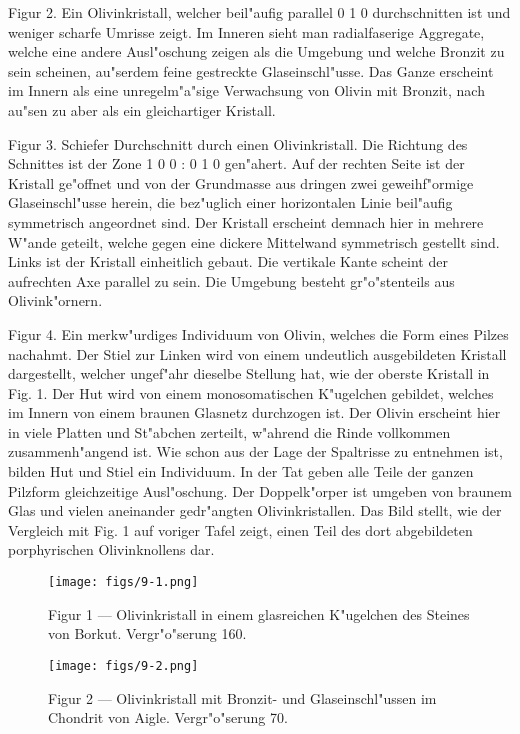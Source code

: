 \documentclass[a4paper, 11pt, oneside, polutonikogreek, german]{article}
\begin{document}
Figur 2. Ein Olivinkristall, welcher beil"aufig parallel 0 1 0 durchschnitten ist und weniger scharfe Umrisse zeigt. Im Inneren sieht man radialfaserige Aggregate, welche eine andere Ausl"oschung zeigen als die Umgebung und welche Bronzit zu sein scheinen, au"serdem feine gestreckte Glaseinschl"usse. Das Ganze erscheint im Innern als eine unregelm"a"sige Verwachsung von Olivin mit Bronzit, nach au"sen zu aber als ein gleichartiger Kristall.

Figur 3. Schiefer Durchschnitt durch einen Olivinkristall. Die Richtung des Schnittes ist der Zone 1 0 0 : 0 1 0 gen"ahert. Auf der rechten Seite ist der Kristall ge"offnet und von der Grundmasse aus dringen zwei geweihf"ormige Glaseinschl"usse herein, die bez"uglich einer horizontalen Linie beil"aufig symmetrisch angeordnet sind. Der Kristall erscheint demnach hier in mehrere W"ande geteilt, welche gegen eine dickere Mittelwand symmetrisch gestellt sind. Links ist der Kristall einheitlich gebaut. Die vertikale Kante scheint der aufrechten Axe parallel zu sein. Die Umgebung besteht gr"o"stenteils aus Olivink"ornern.

Figur 4. Ein merkw"urdiges Individuum von Olivin, welches die Form eines Pilzes nachahmt. Der Stiel zur Linken wird von einem undeutlich ausgebildeten Kristall dargestellt, welcher ungef"ahr dieselbe Stellung hat, wie der oberste Kristall in Fig. 1. Der Hut wird von einem monosomatischen K"ugelchen gebildet, welches im Innern von einem braunen Glasnetz durchzogen ist. Der Olivin erscheint hier in viele Platten und St"abchen zerteilt, w"ahrend die Rinde vollkommen zusammenh"angend ist. Wie schon aus der Lage der Spaltrisse zu entnehmen ist, bilden Hut und Stiel ein Individuum. In der Tat geben alle Teile der ganzen Pilzform gleichzeitige Ausl"oschung. Der Doppelk"orper ist umgeben von braunem Glas und vielen aneinander gedr"angten Olivinkristallen. Das Bild stellt, wie der Vergleich mit Fig. 1 auf voriger Tafel zeigt, einen Teil des dort abgebildeten porphyrischen Olivinknollens dar.
\clearpage

\vspace*{\fill}
\begin{figure}[H]
\centering
\texttt{[image: figs/9-1.png]}
\caption{\small Figur 1 --- Olivinkristall in einem glasreichen K"ugelchen des Steines von Borkut. Vergr"o"serung 160.}
\end{figure}
\vspace*{\fill}
\clearpage

\vspace*{\fill}
\begin{figure}[H]
\centering
\texttt{[image: figs/9-2.png]}
\caption{\small Figur 2 --- Olivinkristall mit Bronzit- und Glaseinschl"ussen im Chondrit von Aigle. Vergr"o"serung 70.}
\end{figure}
\vspace*{\fill}
\clearpage
\end{document}
